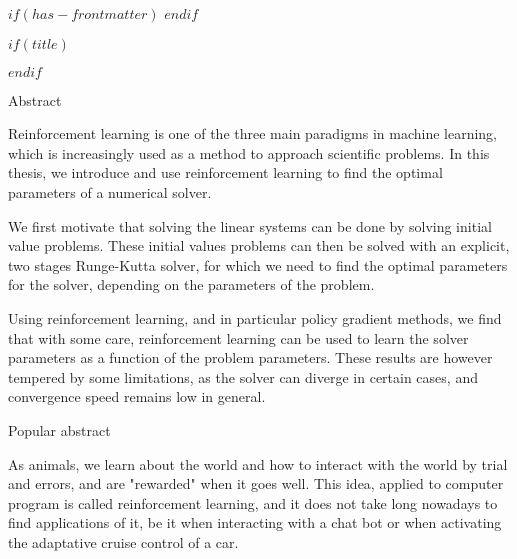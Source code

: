 $if(has-frontmatter)$
\frontmatter
$endif$

$if(title)$
\maketitle
$endif$

\newpage


\begin{center}
\huge{Abstract}
\end{center}

\vspace*{\baselineskip}

Reinforcement learning is one of the three main paradigms in machine learning, which is increasingly used as a method to approach scientific problems. In this thesis, we introduce and use reinforcement learning to find the optimal parameters of a numerical solver.

We first motivate that solving the linear systems can be done by solving initial value problems. These initial values problems can then be solved with an explicit, two stages Runge-Kutta solver, for which we need to find the optimal parameters for the solver, depending on the parameters of the problem.   

Using reinforcement learning, and in particular policy gradient methods, we find that with some care, reinforcement learning can be used to learn the 
solver parameters as a function of the problem parameters. These results are however tempered by some limitations, as the solver can diverge in certain cases, and convergence speed remains low in general.

\vspace*{\baselineskip}

\begin{center}
\huge{Popular abstract}
\end{center}

\vspace*{\baselineskip}

As animals, we learn about the world and how to interact with the world by trial and errors, and are "rewarded" when it goes well. This idea, applied to computer program is called reinforcement learning, and it does not take long nowadays to find applications of it, be it when interacting with a chat bot or when activating the adaptative cruise control of a car.

